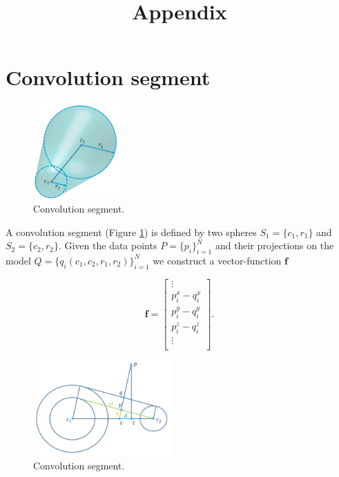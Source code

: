 \documentclass[10pt,journal,a4paper]{IEEEtran}
\title{Appendix}
\begin{document}
\maketitle

\section{Convolution segment}

\begin{figure}[h!] 
	\centering
	\hspace{-2em}
	\includegraphics[width=0.3\textwidth]{fig/convsegment.png}
	\caption{Convolution segment.}
	\label{fig:convsegment}
\end{figure}

A convolution segment (Figure \ref{fig:convsegment}) is defined by two spheres $S_1 = \{c_1, r_1\}$ and $S_2 = \{c_2, r_2\}$.
Given the data points $P = \{p_i\}_{i = 1}^N$ and their projections on the model  $Q = \{q_i(c_1, c_2, r_1, r_2)\}_{i = 1}^N$  we construct a vector-function $\textbf{f}$ 

 \begin{equation}
 	\textbf{f} = \left[
 		\begin{array}{c}
 			\vdots \\
			p_i^x - q_i^x\\
			p_i^y - q_i^y\\
			p_i^z - q_i^z\\
			\vdots \\
	\end{array}
 	\right].
 \end{equation} 

\begin{figure}[h!] 
	\centering
	\hspace{-2em}
	\includegraphics[width=0.47\textwidth]{fig/projection_convsegment.png}
	\caption{Convolution segment.}
	\label{fig:projection_convsegment}
\end{figure}
\end{document}
